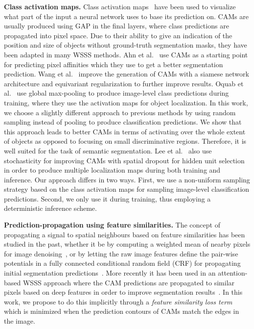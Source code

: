 \documentclass{article}
\begin{document}
\textbf{Class activation maps.} Class activation maps~\cite{zhou2016cvpr, selvaraju2017iccv} have been used to visualize what part of the input a neural network uses to base its prediction on. CAMs are usually produced using GAP in the final layers, where class predictions are propagated into pixel space. Due to their ability to give an indication of the position and size of objects without ground-truth segmentation masks, they have been adapted in many WSSS methods. Ahn et al.~\cite{ahn2018cvpr} use CAMs as a starting point for predicting pixel affinities which they use to get a better segmentation prediction. Wang et al.~\cite{wang2020cvpr} improve the generation of CAMs with a siamese network architecture and equivariant regularization to further improve results. Oquab et al.~\cite{oquab2015cvpr} use global max-pooling to produce image-level class predictions during training, where they use the activation maps for object localization. In this work, we choose a slightly different approach to previous methods by using random sampling instead of pooling to produce classification predictions. We show that this approach leads to better CAMs in terms of activating over the whole extent of objects as opposed to focusing on small discriminative regions. Therefore, it is well suited for the task of semantic segmentation. Lee et al.~\cite{lee2019cvpr} also use stochasticity for improving CAMs with spatial dropout for hidden unit selection in order to produce multiple localization maps during both training and inference. Our approach differs in two ways. First, we use a non-uniform sampling strategy based on the class activation maps for sampling image-level classification predictions. Second, we only use it during training, thus employing a deterministic inference scheme.

\textbf{Prediction-propagation using feature similarities.} The concept of propagating a signal to spatial neighbours based on feature similarities has been studied in the past, whether it be by computing a weighted mean of nearby pixels for image denoising~\cite{buades2011ipol}, or by letting the raw image features define the pair-wise potentials in a fully connected conditional random field (CRF) for propagating initial segmentation predictions~\cite{krahenbuhl2011neurips}. More recently it has been used in an attention-based WSSS approach where the CAM predictions are propagated to similar pixels based on deep features in order to improve segmentation results~\cite{wang2020cvpr}. In this work, we propose to do this implicitly through a \textit{feature similarity loss term} which is minimized when the prediction contours of CAMs match the edges in the image.
\end{document}
